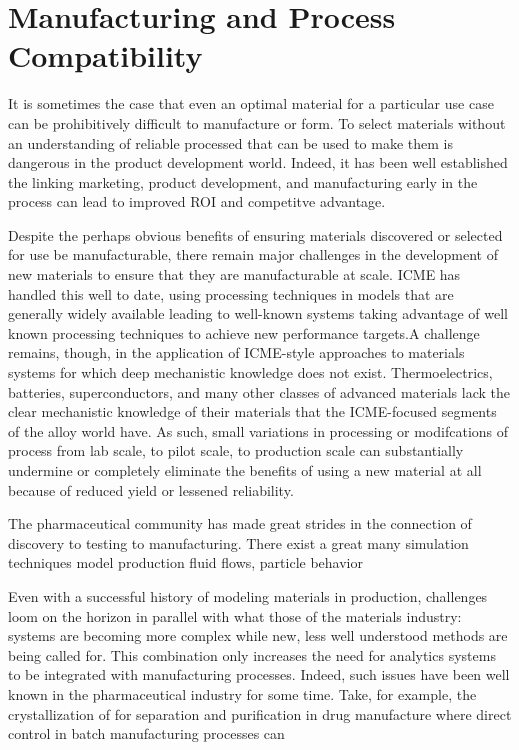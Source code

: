 \section{Manufacturing and Process Compatibility}
It is sometimes the case that even an optimal material for a particular use case can be prohibitively difficult to manufacture or form. To select materials without an understanding of reliable processed that can be used to make them is dangerous in the product development world. Indeed, it has been well established the linking marketing, product development, and manufacturing early in the process can lead to improved ROI and competitve advantage\cite{Swink2007203}.

Despite the perhaps obvious benefits of ensuring materials discovered or selected for use be manufacturable, there remain major challenges in the development of new materials to ensure that they are manufacturable at scale. ICME has handled this well to date, using processing techniques in models that are generally widely available leading to well-known systems taking advantage of well known processing techniques to achieve new performance targets.A challenge remains, though, in the application of ICME-style approaches to materials systems for which deep mechanistic knowledge does not exist. Thermoelectrics, batteries, superconductors, and many other classes of advanced materials lack the clear mechanistic knowledge of their materials that the ICME-focused segments of the alloy world have. As such, small variations in processing or modifcations of process from lab scale, to pilot scale, to production scale can substantially undermine or completely eliminate the benefits of using a new material at all because of reduced yield or lessened reliability.

The pharmaceutical community has made great strides in the connection of discovery to testing to manufacturing. There exist a great many simulation techniques model production fluid flows, particle behavior

Even with a successful history of modeling materials in production, challenges loom on the horizon in parallel with what those of the materials industry: systems are becoming more complex while new, less well understood methods are being called for. This combination only increases the need for analytics systems to be integrated with manufacturing processes\cite{JPS:JPS24594}. Indeed, such issues have been well known in the pharmaceutical industry for some time. Take, for example, the crystallization of for separation and purification in drug manufacture where direct control in batch manufacturing processes can  \cite{Fujiwara2005493}


